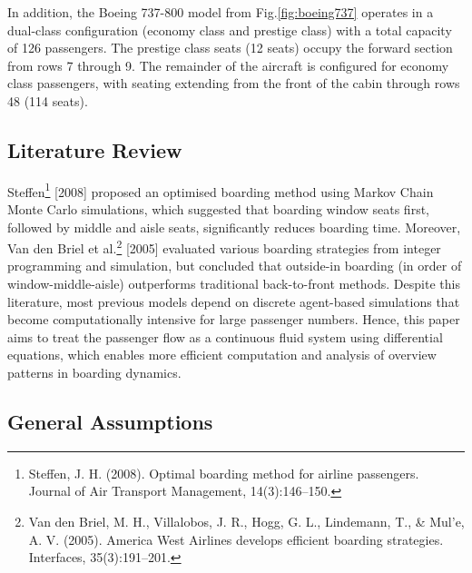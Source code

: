 \documentclass[12pt]{article}
\begin{document}
In addition, the Boeing 737-800 model from Fig.\ref{fig:boeing737} operates in a dual-class configuration (economy class and prestige class) with a total capacity of 126 passengers. The prestige class seats (12 seats) occupy the forward section from rows 7 through 9. The remainder of the aircraft is configured for economy class passengers, with seating extending from the front of the cabin through rows 48 (114 seats).

\subsection{Literature Review}

Steffen\footnote{Steffen, J. H. (2008). Optimal boarding method for airline passengers. Journal of Air Transport Management, 14(3):146–150.} [2008] proposed an optimised boarding method using Markov Chain Monte Carlo simulations, which suggested that boarding window seats first, followed by middle and aisle seats, significantly reduces boarding time. Moreover, Van den Briel et al.\footnote{Van den Briel, M. H., Villalobos, J. R., Hogg, G. L., Lindemann, T., \& Mul'e, A. V. (2005). America West Airlines develops efficient boarding strategies. Interfaces, 35(3):191–201.} [2005] evaluated various boarding strategies from integer programming and simulation, but concluded that outside-in boarding (in order of window-middle-aisle) outperforms traditional back-to-front methods. Despite this literature, most previous models depend on discrete agent-based simulations that become computationally intensive for large passenger numbers. Hence, this paper aims to treat the passenger flow as a continuous fluid system using differential equations, which enables more efficient computation and analysis of overview patterns in boarding dynamics.

\subsection{General Assumptions}
\end{document}
